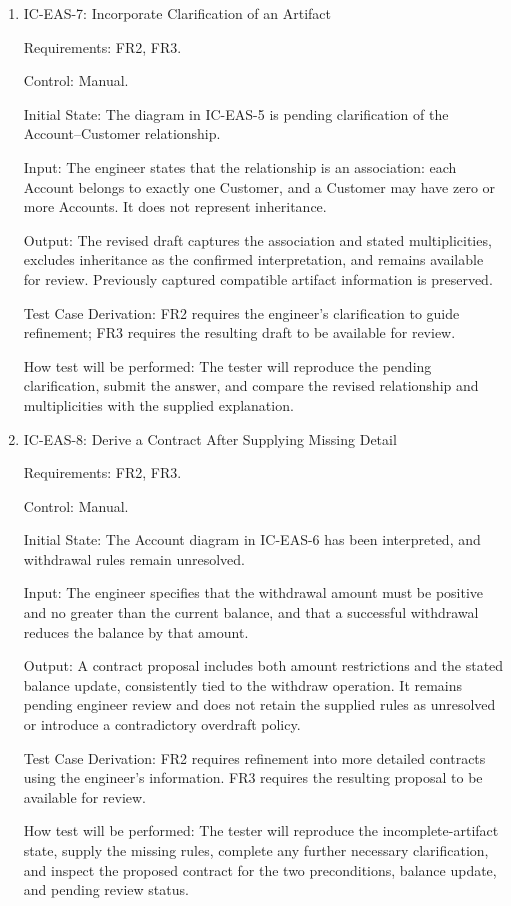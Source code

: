 \documentclass[12pt, titlepage]{article}
\begin{document}
\begin{enumerate}
How test will be performed: The tester will submit the diagram, inspect the
captured structural details and clarification questions, and check that
missing rules are not presented as confirmed contract conditions.

\item{IC-EAS-7: Incorporate Clarification of an Artifact\\}

Requirements: FR2, FR3.

Control: Manual.

Initial State: The diagram in IC-EAS-5 is pending clarification of the
Account--Customer relationship.

Input: The engineer states that the relationship is an association: each
Account belongs to exactly one Customer, and a Customer may have zero or more
Accounts. It does not represent inheritance.

Output: The revised draft captures the association and stated multiplicities,
excludes inheritance as the confirmed interpretation, and remains available
for review. Previously captured compatible artifact information is preserved.

Test Case Derivation: FR2 requires the engineer's clarification to guide
refinement; FR3 requires the resulting draft to be available for review.

How test will be performed: The tester will reproduce the pending
clarification, submit the answer, and compare the revised relationship and
multiplicities with the supplied explanation.

\item{IC-EAS-8: Derive a Contract After Supplying Missing Detail\\}

Requirements: FR2, FR3.

Control: Manual.

Initial State: The Account diagram in IC-EAS-6 has been interpreted, and
withdrawal rules remain unresolved.

Input: The engineer specifies that the withdrawal amount must be positive and
no greater than the current balance, and that a successful withdrawal reduces
the balance by that amount.

Output: A contract proposal includes both amount restrictions and the stated
balance update, consistently tied to the withdraw operation. It remains
pending engineer review and does not retain the supplied rules as unresolved
or introduce a contradictory overdraft policy.

Test Case Derivation: FR2 requires refinement into more detailed contracts
using the engineer's information. FR3 requires the resulting proposal to be
available for review.

How test will be performed: The tester will reproduce the incomplete-artifact
state, supply the missing rules, complete any further necessary clarification,
and inspect the proposed contract for the two preconditions, balance update,
and pending review status.

\end{enumerate}
\end{document}
